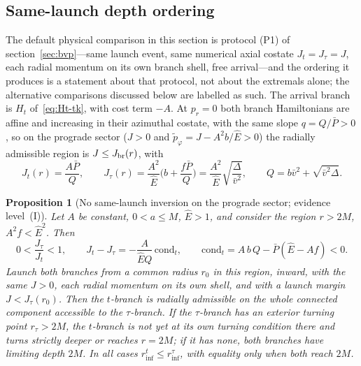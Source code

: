 \documentclass[12pt]{iopart}
\theoremstyle{plain}
\newtheorem{proposition}{Proposition}
\theoremstyle{definition}
\theoremstyle{remark}
\newcommand{\Ehat}{\hat E}
\begin{document}
\subsection{Same-launch depth ordering}
\label{sec:inversion}
The default physical comparison in this section is protocol (P1) of
section~\ref{sec:bvp}---same launch event, same numerical axial costate $J_t=J_\tau=J$, each
radial momentum on its own branch shell, free arrival---and the ordering it produces is a
statement about that protocol, not about the extremals alone; the alternative comparisons
discussed below are labelled as such. The arrival branch is $H_t$ of~\eqref{eq:Ht-tk}, with
cost term $-A$. At $p_r=0$ both branch Hamiltonians are affine and increasing in their
azimuthal costate, with the same slope $q=Q/\bar P>0$, so on the prograde sector ($J>0$ and
$\tilde p_\varphi=J-A^2b/\Ehat>0$) the radially admissible region is $J\le J_{\rm br}(r)$, with
\begin{equation}
    J_t(r)=\frac{A\bar P}{Q},\qquad
    J_\tau(r)=\frac{A^2}{\Ehat}\Big(b+\frac{f\bar P}{Q}\Big)=\frac{A^2}{\Ehat}\sqrt{\frac{\Delta}{\bar v^2}},\qquad
    Q=b\bar v^2+\sqrt{\bar v^2\Delta}.
    \label{eq:turning-J}
\end{equation}

\begin{proposition}[No same-launch inversion on the prograde sector; evidence level~(I)]
\label{prop:same-launch}
Let $A$ be constant, $0<a\le M$, $\Ehat>1$, and consider the region $r>2M$, $A^2f<\Ehat^2$. Then
\begin{equation}
    0<\frac{J_\tau}{J_t}<1,\qquad
    J_t-J_\tau=-\frac{A}{\Ehat Q}\,\mathrm{cond}_t,\qquad
    \mathrm{cond}_t=A\,b\,Q-\bar P(\Ehat-Af)<0 .
    \label{eq:condinv}
\end{equation}
Launch both branches from a common radius $r_0$ in this region, inward, with the same $J>0$,
each radial momentum on its own shell, and with a launch margin $J<J_\tau(r_0)$. Then the
$t$-branch is radially admissible on the whole connected component accessible to the
$\tau$-branch. If the $\tau$-branch has an exterior turning point $r_\tau>2M$, the
$t$-branch is not yet at its own turning condition there and turns strictly deeper or
reaches $r=2M$; if it has none, both branches have limiting depth $2M$. In all cases
$r^t_{\inf}\le r^\tau_{\inf}$, with equality only when both reach $2M$.
\end{proposition}
\end{document}
